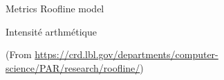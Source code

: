 %
\begin{Frame}{Metrics Roofline model}
      \begin{block}{Intensité arthmétique}
      \end{block}   
 (From \url{https://crd.lbl.gov/departments/computer-science/PAR/research/roofline/})
\end{Frame}


